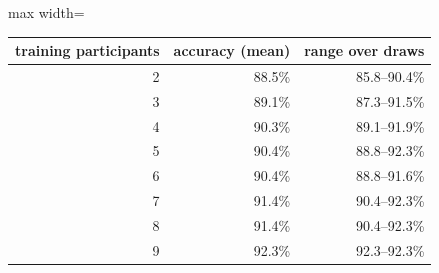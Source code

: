 \begin{adjustbox}{max width=\textwidth}
{\footnotesize
\begin{tabular}{rrr}
\toprule
\textbf{training participants} & \textbf{accuracy (mean)} & \textbf{range over draws} \\
\midrule
2 & 88.5\% & 85.8--90.4\% \\
3 & 89.1\% & 87.3--91.5\% \\
4 & 90.3\% & 89.1--91.9\% \\
5 & 90.4\% & 88.8--92.3\% \\
6 & 90.4\% & 88.8--91.6\% \\
7 & 91.4\% & 90.4--92.3\% \\
8 & 91.4\% & 90.4--92.3\% \\
9 & 92.3\% & 92.3--92.3\% \\
\bottomrule
\end{tabular}
}
\end{adjustbox}
